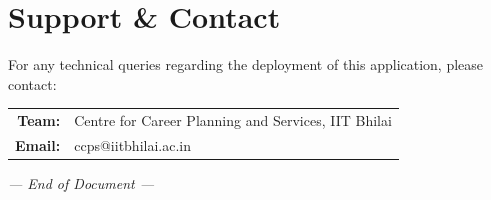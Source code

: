 \documentclass[12pt,a4paper]{article}
\begin{document}
\section{Support \& Contact}

For any technical queries regarding the deployment of this application, please contact:

\begin{center}
\begin{tabular}{rl}
    \textbf{Team:}   & Centre for Career Planning and Services, IIT Bhilai \\
    \textbf{Email:}  & ccps@iitbhilai.ac.in \\
\end{tabular}
\end{center}

\vfill
\begin{center}
    \small\textit{--- End of Document ---}
\end{center}
\end{document}
